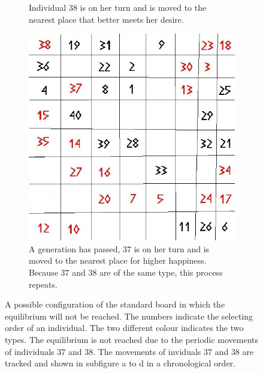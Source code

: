 \begin{figure}[H]
\begin{subfigure}{0.3\textwidth}
        \caption{Individual $38$ is on her turn and is moved to the nearest place that better meets her desire.}
        \label{fig:movement3}
    \end{subfigure}\hspace{1cm}
    \begin{subfigure}{0.3\textwidth}
        \includegraphics[width=\textwidth]{Tegenvoorbeeld/segregation_tegenvb_3.jpg}
        \caption{A generation has passed, $37$ is on her turn and is moved to the nearest place for higher happiness. Because $37$ and $38$ are of the same type, this process repeats. }
        \label{fig:movement4}
    \end{subfigure}
    \caption{A possible configuration of the standard board in which the equilibrium will not be reached. The numbers indicate the selecting order of an individual. The two different colour indicates the two types. The equilibrium is not reached due to the periodic movements of individuals $37$ and $38$. The movements of inviduals $37$ and $38$ are tracked and shown in subfigure a to d in a chronological order.}\label{fig:equilibrium counterexample}
\end{figure}




